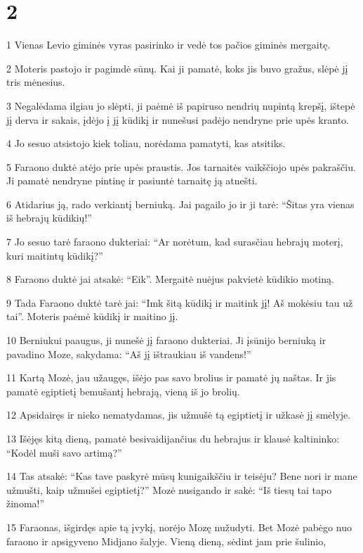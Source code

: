 \chapter{2}

\par 1 Vienas Levio giminės vyras pasirinko ir vedė tos pačios giminės mergaitę. 
\par 2 Moteris pastojo ir pagimdė sūnų. Kai ji pamatė, koks jis buvo gražus, slėpė jį tris mėnesius. 
\par 3 Negalėdama ilgiau jo slėpti, ji paėmė iš papiruso nendrių nupintą krepšį, ištepė jį derva ir sakais, įdėjo į jį kūdikį ir nunešusi padėjo nendryne prie upės kranto. 
\par 4 Jo sesuo atsistojo kiek toliau, norėdama pamatyti, kas atsitiks. 
\par 5 Faraono duktė atėjo prie upės praustis. Jos tarnaitės vaikščiojo upės pakraščiu. Ji pamatė nendryne pintinę ir pasiuntė tarnaitę ją atnešti. 
\par 6 Atidarius ją, rado verkiantį berniuką. Jai pagailo jo ir ji tarė: “Šitas yra vienas iš hebrajų kūdikių!” 
\par 7 Jo sesuo tarė faraono dukteriai: “Ar norėtum, kad surasčiau hebrajų moterį, kuri maitintų kūdikį?” 
\par 8 Faraono duktė jai atsakė: “Eik”. Mergaitė nuėjus pakvietė kūdikio motiną. 
\par 9 Tada Faraono duktė tarė jai: “Imk šitą kūdikį ir maitink jį! Aš mokėsiu tau už tai”. Moteris paėmė kūdikį ir maitino jį. 
\par 10 Berniukui paaugus, ji nunešė jį faraono dukteriai. Ji įsūnijo berniuką ir pavadino Moze, sakydama: “Aš jį ištraukiau iš vandens!” 
\par 11 Kartą Mozė, jau užaugęs, išėjo pas savo brolius ir pamatė jų naštas. Ir jis pamatė egiptietį bemušantį hebrają, vieną iš jo brolių. 
\par 12 Apsidairęs ir nieko nematydamas, jis užmušė tą egiptietį ir užkasė jį smėlyje. 
\par 13 Išėjęs kitą dieną, pamatė besivaidijančius du hebrajus ir klausė kaltininko: “Kodėl muši savo artimą?” 
\par 14 Tas atsakė: “Kas tave paskyrė mūsų kunigaikščiu ir teisėju? Bene nori ir mane užmušti, kaip užmušei egiptietį?” Mozė nusigando ir sakė: “Iš tiesų tai tapo žinoma!” 
\par 15 Faraonas, išgirdęs apie tą įvykį, norėjo Mozę nužudyti. Bet Mozė pabėgo nuo faraono ir apsigyveno Midjano šalyje. Vieną dieną, sėdint jam prie šulinio, 

